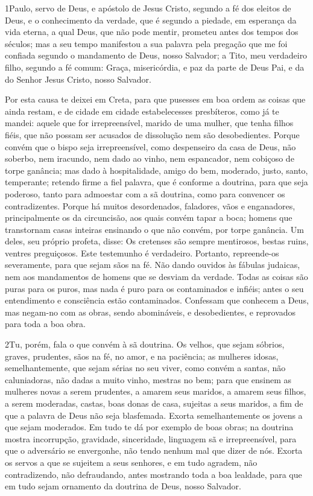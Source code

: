 
\lettrine{1} Paulo, servo de Deus, e apóstolo de Jesus Cristo,
segundo a fé dos eleitos de Deus, e o conhecimento da verdade, que é
segundo a piedade, em esperança da vida eterna, a qual Deus, que
não pode mentir, prometeu antes dos tempos dos séculos; mas a
seu tempo manifestou a sua palavra pela pregação que me foi confiada
segundo o mandamento de Deus, nosso Salvador; a Tito, meu
verdadeiro filho, segundo a fé comum: Graça, misericórdia, e paz da
parte de Deus Pai, e da do Senhor Jesus Cristo, nosso Salvador.

Por esta causa te deixei em Creta, para que pusesses em boa ordem
as coisas que ainda restam, e de cidade em cidade estabelecesses
presbíteros, como já te mandei: aquele que for irrepreensível,
marido de uma mulher, que tenha filhos fiéis, que não possam ser
acusados de dissolução nem são desobedientes. Porque convém que
o bispo seja irrepreensível, como despenseiro da casa de Deus, não
soberbo, nem iracundo, nem dado ao vinho, nem espancador, nem
cobiçoso de torpe ganância; mas dado à hospitalidade, amigo do
bem, moderado, justo, santo, temperante; retendo firme a fiel
palavra, que é conforme a doutrina, para que seja poderoso, tanto
para admoestar com a sã doutrina, como para convencer os
contradizentes. Porque há muitos desordenados, faladores,
vãos e enganadores, principalmente os da circuncisão, aos
quais convém tapar a boca; homens que transtornam casas inteiras
ensinando o que não convém, por torpe ganância. Um deles, seu
próprio profeta, disse: Os cretenses são sempre mentirosos, bestas
ruins, ventres preguiçosos. Este testemunho é verdadeiro.
Portanto, repreende-os severamente, para que sejam sãos na fé.
Não dando ouvidos às fábulas judaicas, nem aos mandamentos de
homens que se desviam da verdade. Todas as coisas são puras
para os puros, mas nada é puro para os contaminados e infiéis; antes
o seu entendimento e consciência estão contaminados.
Confessam que conhecem a Deus, mas negam-no com as obras,
sendo abomináveis, e desobedientes, e reprovados para toda a boa
obra.

\medskip

\lettrine{2} Tu, porém, fala o que convém à sã doutrina.
Os velhos, que sejam sóbrios, graves, prudentes, sãos na fé, no
amor, e na paciência; as mulheres idosas, semelhantemente, que
sejam sérias no seu viver, como convém a santas, não caluniadoras,
não dadas a muito vinho, mestras no bem; para que ensinem as
mulheres novas a serem prudentes, a amarem seus maridos, a amarem
seus filhos, a serem moderadas, castas, boas donas de casa,
sujeitas a seus maridos, a fim de que a palavra de Deus não seja
blasfemada. Exorta semelhantemente os jovens a que sejam
moderados. Em tudo te dá por exemplo de boas obras; na doutrina
mostra incorrupção, gravidade, sinceridade, linguagem sã e
irrepreensível, para que o adversário se envergonhe, não tendo
nenhum mal que dizer de nós. Exorta os servos a que se sujeitem
a seus senhores, e em tudo agradem, não contradizendo, não
defraudando, antes mostrando toda a boa lealdade, para que em tudo
sejam ornamento da doutrina de Deus, nosso Salvador.

